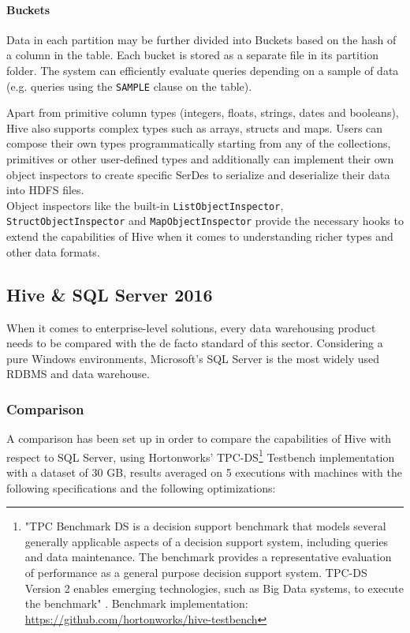 \paragraph{Buckets} Data in each partition may be further divided into Buckets based on the hash of a column in the table. Each bucket is stored as a separate file in its partition folder. The system can efficiently evaluate queries depending on a sample of data (e.g. queries using the \texttt{SAMPLE} clause on the table).
\newline
\par
Apart from primitive column types (integers, floats, strings, dates and booleans), Hive also supports complex types such as arrays, structs and maps. Users can compose their own types programmatically starting from any of the collections, primitives or other user-defined types and additionally can implement their own object inspectors to create specific SerDes to serialize and deserialize their data into HDFS files.\\
Object inspectors like the built-in \texttt{ListObjectInspector}, \texttt{StructObjectInspector} and \texttt{MapObjectInspector} provide the necessary hooks to extend the capabilities of Hive when it comes to understanding richer types and other data formats.

\subsection{Hive \& SQL Server 2016}

When it comes to enterprise-level solutions, every data warehousing product needs to be compared with the de facto standard of this sector. Considering a pure Windows environments, Microsoft's SQL Server is the most widely used RDBMS and data warehouse.\newline

\subsubsection{Comparison}

A comparison has been set up in order to compare the capabilities of Hive with respect to SQL Server, using Hortonworks' TPC-DS\footnote{"TPC Benchmark DS is a decision support benchmark that models several generally applicable aspects of a decision support system, including queries and data maintenance. The benchmark provides a representative evaluation of performance as a general purpose decision support system. TPC-DS Version 2 enables emerging technologies, such as Big Data systems, to execute the benchmark" \cite{tpcds} . Benchmark implementation: \href{https://github.com/hortonworks/hive-testbench}{https://github.com/hortonworks/hive-testbench}} Testbench implementation with a dataset of 30 GB, results averaged on 5 executions with machines with the following specifications and the following optimizations:
\newline

